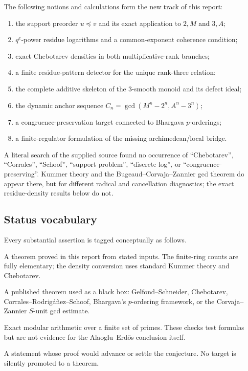 \documentclass[11pt]{article}
\theoremstyle{definition}
\theoremstyle{remark}
\newcommand{\newresult}{\textcolor{deepgreen}{\textbf{NEW--UNCONDITIONAL}}}
\newcommand{\classical}{\textcolor{deepblue}{\textbf{CLASSICAL INPUT}}}
\newcommand{\computational}{\textcolor{deepred}{\textbf{COMPUTATIONAL CHECK}}}
\newcommand{\target}{\textcolor{deepred}{\textbf{OPEN TARGET}}}
\begin{document}
The following notions and calculations form the new track of this report:
\begin{enumerate}[leftmargin=2.2em,itemsep=2pt]
\item the support preorder $u\preccurlyeq v$ and its exact application to $2,M$ and $3,A$;
\item $q^e$-power residue logarithms and a common-exponent coherence condition;
\item exact Chebotarev densities in both multiplicative-rank branches;
\item a finite residue-pattern detector for the unique rank-three relation;
\item the complete additive skeleton of the $3$-smooth monoid and its defect ideal;
\item the dynamic anchor sequence $C_n=\gcd(M^n-2^n,A^n-3^n)$;
\item a congruence-preservation target connected to Bhargava $p$-orderings;
\item a finite-regulator formulation of the missing archimedean/local bridge.
\end{enumerate}
A literal search of the supplied source found no occurrence of ``Chebotarev'',
``Corrales'', ``Schoof'', ``support problem'', ``discrete log'', or
``congruence-preserving''.  Kummer theory and the Bugeaud--Corvaja--Zannier gcd theorem do appear
there, but for different radical and cancellation diagnostics; the exact residue-density results
below do not.

\subsection{Status vocabulary}

Every substantial assertion is tagged conceptually as follows.
\begin{description}[style=nextline,leftmargin=1.8em]
\item[\newresult] A theorem proved in this report from stated inputs.  The finite-ring counts are
fully elementary; the density conversion uses standard Kummer theory and Chebotarev.
\item[\classical] A published theorem used as a black box: Gelfond--Schneider,
Chebotarev, Corrales--Rodrig\'a\~nez--Schoof, Bhargava's $p$-ordering framework, or the
Corvaja--Zannier $S$-unit gcd estimate.
\item[\computational] Exact modular arithmetic over a finite set of primes.  These checks test
formulas but are not evidence for the Alaoglu--Erd\H{o}s conclusion itself.
\item[\target] A statement whose proof would advance or settle the conjecture.  No target is
silently promoted to a theorem.
\end{description}
\end{document}
